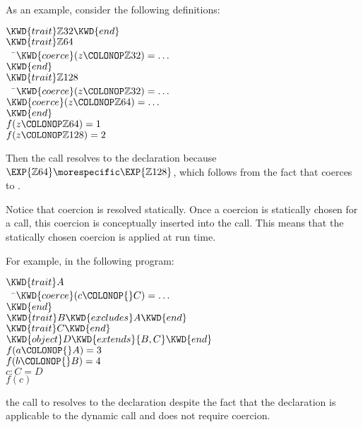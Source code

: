 As an example, consider the following definitions:
%
\begin{Fortress}
\(\KWD{trait} \mathbb{Z}32 \KWD{end}\)\\
\(\KWD{trait} \mathbb{Z}64\)\\
{\tt~~}\pushtabs\=\+\(  \KWD{coerce}(z\COLONOP\mathbb{Z}32) = \ldots\)\-\\\poptabs
\(\KWD{end}\)\\
\(\KWD{trait} \mathbb{Z}128\)\\
{\tt~~}\pushtabs\=\+\(  \KWD{coerce}(z\COLONOP\mathbb{Z}32) = \ldots\)\\
\(  \KWD{coerce}(z\COLONOP\mathbb{Z}64) = \ldots\)\-\\\poptabs
\(\KWD{end}\)\\[4pt]
\(f(z\COLONOP\mathbb{Z}64) = 1\)\\
\(f(z\COLONOP\mathbb{Z}128) = 2\)
\end{Fortress}
Then the call  resolves to the
declaration  because $\EXP{\mathbb{Z}64}
\morespecific \EXP{\mathbb{Z}128}$, which follows from the fact that
 coerces to .

Notice that coercion is resolved statically.  Once a coercion is
statically chosen for a call, this coercion is conceptually inserted
into the call.
This means that the statically chosen coercion is applied at run time.

For example, in the following program:
%
%
\begin{Fortress}
\(\KWD{trait} A\)\\
{\tt~~}\pushtabs\=\+\(  \KWD{coerce}(c\COLONOP{}C) = \ldots\)\-\\\poptabs
\(\KWD{end}\)\\
\(\KWD{trait} B \KWD{excludes} A \KWD{end}\)\\
\(\KWD{trait} C \KWD{end}\)\\
\(\KWD{object} D \KWD{extends} \{B,C\} \KWD{end}\)\\[4pt]
\(f(a\COLONOP{}A) = 3\)\\
\(f(b\COLONOP{}B) = 4\)\\[4pt]
\(c \mathrel{\mathtt{:}} C = D\)\\
\(f(c)\)
\end{Fortress}
the call to  resolves to the declaration
 despite the fact that the declaration
 is
applicable to the dynamic call  and does not require
coercion.




